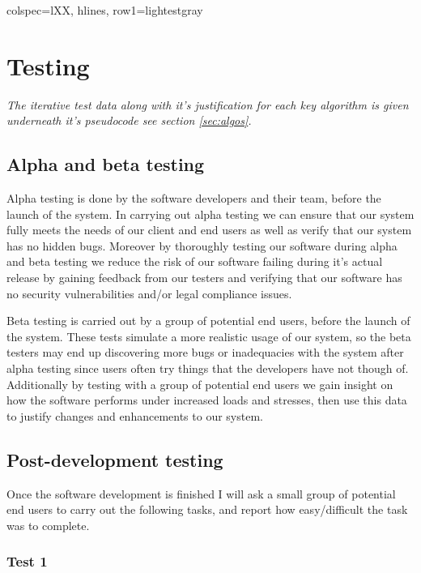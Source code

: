 \begin{longtblr}[
  caption={Data validation rules.}
]{colspec={lXX}, hlines, row{1}={lightestgray}}
\end{longtblr}


\section{Testing}

\textit{The iterative test data along with it's
justification for each key algorithm is given
underneath it's pseudocode see section 
\ref{sec:algos}.}\\ \vspace{0.2cm}

\subsection{Alpha and beta testing}

Alpha testing is done by the software developers and their
team, before the launch of the system. In carrying out alpha
testing we can ensure that our system fully meets the needs
of our client and end users as well as verify that our system
has no hidden bugs. Moreover by thoroughly testing our
software during alpha and beta testing we reduce the risk
of our software failing during it's actual release by 
gaining feedback from our testers and verifying that our 
software has no security vulnerabilities and/or legal
compliance issues. \\ \vspace{0.2cm}

Beta testing is carried out by a group of potential end
users, before the launch of the system. These tests 
simulate a more realistic usage of our system, so the 
beta testers may end up discovering more bugs or 
inadequacies with the system after alpha testing since users
often try things that the developers have not though of. 
Additionally by testing with a group of potential end users 
we gain insight on how the software performs under increased 
loads and stresses, then use this data to justify changes
and enhancements to our system.

\subsection{Post-development testing}

Once the software development is finished I will ask a 
small group of potential end users to carry out the following
tasks, and report how easy/difficult the task was to complete.

\subsubsection{Test 1}

